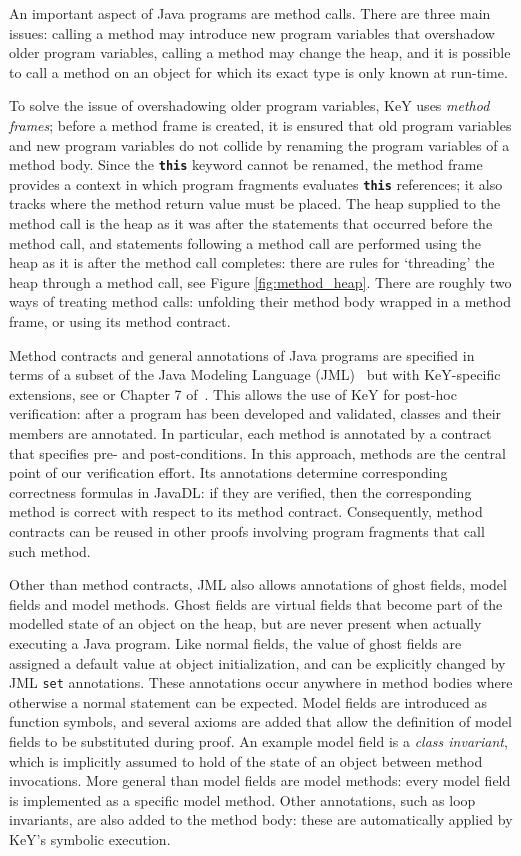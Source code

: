 \documentclass[runningheads]{llncs}
\begin{document}
An important aspect of Java programs are method calls. There are three main issues: calling a method may introduce new program variables that overshadow older program variables, calling a method may change the heap, and it is possible to call a method on an object for which its exact type is only known at run-time.

To solve the issue of overshadowing older program variables, KeY uses \emph{method frames}; before a method frame is created, it is ensured that old program variables and new program variables do not collide by renaming the program variables of a method body. Since the \texttt{\textbf{this}} keyword cannot be renamed, the method frame provides a context in which program fragments evaluates \texttt{\textbf{this}} references; it also tracks where the method return value must be placed. The heap supplied to the method call is the heap as it was after the statements that occurred before the method call, and statements following a method call are performed using the heap as it is after the method call completes: there are rules for `threading' the heap through a method call, see Figure \ref{fig:method_heap}. There are roughly two ways of treating method calls: unfolding their method body wrapped in a method frame, or using its method contract.

Method contracts and general annotations of Java programs are specified in terms of a subset of the Java Modeling Language (JML)~\cite{leavens2013jml} but with KeY-specific extensions, see \cite{huisman2014jml} or Chapter 7 of~\cite{ahrendt2016deductive}. This allows the use of KeY for post-hoc verification: after a program has been developed and validated, classes and their members are annotated. In particular, each method is annotated by a contract that specifies pre- and post-conditions. In this approach, methods are the central point of our verification effort. Its annotations determine corresponding correctness formulas in JavaDL: if they are verified, then the corresponding method is correct with respect to its method contract. Consequently, method contracts can be reused in other proofs involving program fragments that call such method.

Other than method contracts, JML also allows annotations of ghost fields, model fields and model methods. Ghost fields are virtual fields that become part of the modelled state of an object on the heap, but are never present when actually executing a Java program. Like normal fields, the value of ghost fields are assigned a default value at object initialization, and can be explicitly changed by JML \texttt{set} annotations. These annotations occur anywhere in method bodies where otherwise a normal statement can be expected. Model fields are introduced as function symbols, and several axioms are added that allow the definition of model fields to be substituted during proof. An example model field is a \emph{class invariant}, which is implicitly assumed to hold of the state of an object between method invocations. More general than model fields are model methods: every model field is implemented as a specific model method. Other annotations, such as loop invariants, are also added to the method body: these are automatically applied by KeY's symbolic execution.
\end{document}
